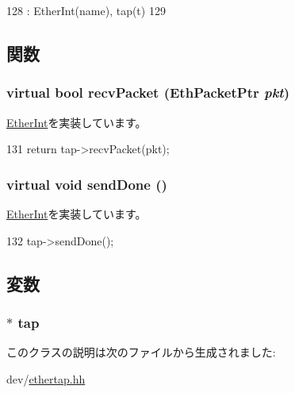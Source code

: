 \begin{DoxyCode}
128             : EtherInt(name), tap(t)
129     { }
\end{DoxyCode}


\subsection{関数}
\hypertarget{classEtherTapInt_a9bd96a108d6f58f140c9f7d83726eebe}{
\subsubsection[{recvPacket}]{\setlength{\rightskip}{0pt plus 5cm}virtual bool recvPacket ({\bf EthPacketPtr} {\em pkt})}}
\label{classEtherTapInt_a9bd96a108d6f58f140c9f7d83726eebe}


\hyperlink{classEtherInt_af3076ea966a2abda7735ea65e8a02034}{EtherInt}を実装しています。


\begin{DoxyCode}
131 { return tap->recvPacket(pkt); }
\end{DoxyCode}
\hypertarget{classEtherTapInt_a967489e0b2900f4b12d99e6257d24dbe}{
\subsubsection[{sendDone}]{\setlength{\rightskip}{0pt plus 5cm}virtual void sendDone ()}}
\label{classEtherTapInt_a967489e0b2900f4b12d99e6257d24dbe}


\hyperlink{classEtherInt_a5a2f0c04ee61250a128bc992d2118390}{EtherInt}を実装しています。


\begin{DoxyCode}
132 { tap->sendDone(); }
\end{DoxyCode}


\subsection{変数}
\hypertarget{classEtherTapInt_afceac4e4f9153ef0f38b7c423422dd2e}{
\subsubsection[{tap}]{$\ast$ {\bf tap}}}
\label{classEtherTapInt_afceac4e4f9153ef0f38b7c423422dd2e}


このクラスの説明は次のファイルから生成されました:\begin{DoxyCompactItemize}
\item 
dev/\hyperlink{ethertap_8hh}{ethertap.hh}\end{DoxyCompactItemize}
